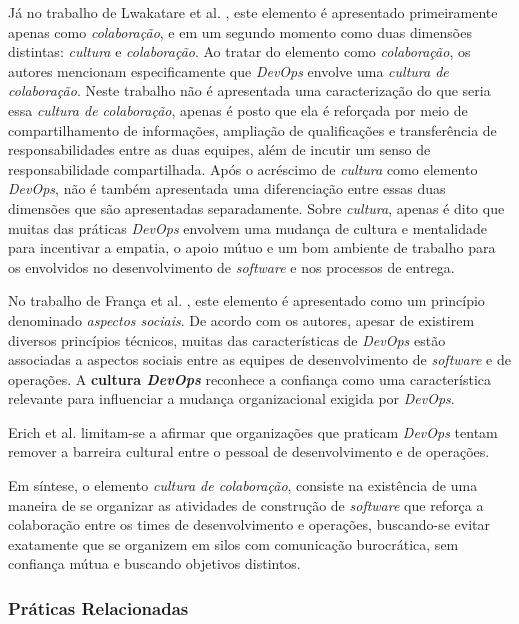 Já no trabalho de Lwakatare et al. \cite{dimensions_of_devops,extending_dimensions},
este elemento é apresentado primeiramente apenas como \emph{colaboração}, e em
um segundo momento como duas dimensões distintas: \emph{cultura} e
\emph{colaboração}. Ao tratar do elemento como \emph{colaboração}, os autores
mencionam especificamente que \textit{DevOps} envolve uma \emph{cultura de colaboração}.
Neste trabalho não é apresentada uma caracterização do que seria essa \emph{cultura
de colaboração}, apenas é posto que ela é reforçada por meio de
compartilhamento de informações, ampliação de qualificações e transferência de
responsabilidades entre as duas equipes, além de incutir um senso de
responsabilidade compartilhada. Após o acréscimo de \emph{cultura} como elemento
\textit{DevOps}, não é também apresentada uma diferenciação entre essas duas
dimensões que são apresentadas separadamente. Sobre \emph{cultura}, apenas é
dito que muitas das práticas \textit{DevOps} envolvem uma mudança de cultura e
mentalidade para incentivar a empatia, o apoio mútuo e um bom ambiente de
trabalho para os envolvidos no desenvolvimento de \textit{software} e
nos processos de entrega.

No trabalho de França et al. \cite{characterizing_devops}, este elemento é
apresentado como um princípio denominado \emph{aspectos sociais}. De acordo com os
autores, apesar de existirem diversos princípios técnicos, muitas das
características de \textit{DevOps} estão associadas a aspectos sociais entre as
equipes de desenvolvimento de \textit{software} e de operações. A \textbf{cultura
\textit{DevOps}} reconhece a confiança como uma característica relevante para
influenciar a mudança organizacional exigida por \textit{DevOps}.

Erich et al. \cite{qualitative_devops_journalsw_17} limitam-se a afirmar que
organizações que praticam \textit{DevOps} tentam remover a barreira cultural
entre o pessoal de desenvolvimento e de operações.

Em síntese, o elemento \emph{cultura de colaboração}, consiste na existência de
 uma maneira de se organizar as atividades de construção
de \textit{software} que reforça a colaboração entre os times de desenvolvimento
e operações, buscando-se evitar exatamente que se organizem em silos com
comunicação burocrática, sem confiança mútua e buscando objetivos distintos.

\subsubsection{Práticas Relacionadas}

